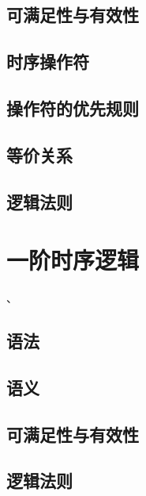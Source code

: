 \subsection{可满足性与有效性}
\subsection{时序操作符}
\subsection{操作符的优先规则}
\subsection{等价关系}
\subsection{逻辑法则}




\newpage
\section{一阶时序逻辑}、
\subsection{语法}
\subsection{语义}
\subsection{可满足性与有效性}
\subsection{逻辑法则}